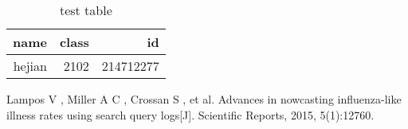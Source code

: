 \documentclass[conference]{IEEEtran}
\begin{document}
\begin{table}
\centering
\caption{test table}
\begin{tabular}{|r|r|r|}
\hline
name & class & id \\
\hline
hejian & 2102 & 214712277 \\
\hline
\end{tabular}

\end{table}

\begin{thebibliography}{00}
  Lampos V , Miller A C , Crossan S , et al. Advances in nowcasting
influenza-like illness rates using search query logs[J]. Scientific Reports,
2015, 5(1):12760.
\end{thebibliography}
\end{document}
